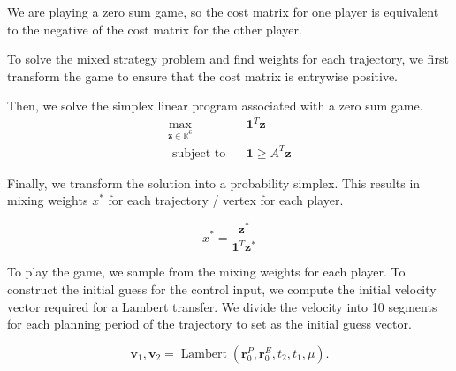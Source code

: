 We are playing a zero sum game, so the cost matrix for one player is equivalent to the negative of the cost matrix for the other player. 

To solve the mixed strategy problem and find weights for each trajectory, we first transform the game to ensure that the cost matrix is entrywise positive. 

Then, we solve the simplex linear program associated with a zero sum game. 
% 
\begin{align}
    \max_{ \mathbf{z} \in \mathbb{R}^6 }    & \; \; \mathbf{1}^T \mathbf{z} \\ 
    \text{ subject to }                     & \; \; \mathbf{1} \geq A^T \mathbf{z}    
\end{align} 

Finally, we transform the solution into a probability simplex. This results in mixing weights $ x^* $ for each trajectory / vertex for each player. 

\begin{equation}
    x^* = \frac{\mathbf{z^*}}{ \mathbf{1}^T \mathbf{z^*} }  
\end{equation} 

To play the game, we sample from the mixing weights for each player. To construct the initial guess for the control input, we compute the initial velocity vector required for a Lambert transfer. We divide the velocity into 10 segments for each planning period of the trajectory to set as the initial guess vector. 


\begin{equation}
    \boldsymbol{v}_1, \boldsymbol{v}_2 = 
    \operatorname{Lambert}
    (\boldsymbol{r}^P_0, \boldsymbol{r}^E_0, t_2, t_1, \mu). \label{eq:min_lambert}
\end{equation} 

